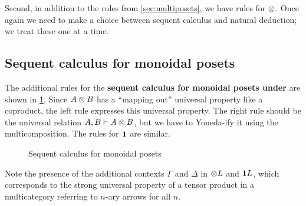 Second, in addition to the rules from \cref{sec:multiposets}, we have rules for $\otimes$.
Once again we need to make a choice between sequent calculus and natural deduction; we treat these one at a time.

\subsection{Sequent calculus for monoidal posets}
\label{sec:seqcalc-monpos}

The additional rules for the \textbf{sequent calculus for monoidal posets under \cG} are shown in \cref{fig:seqcalc-monpos}.
Since $A\otimes B$ has a ``mapping out'' universal property like a coproduct, the left rule expresses this universal property.
The right rule should be the universal relation $A,B\vdash A\otimes B$, but we have to Yoneda-ify it using the multicomposition.
The rules for $\mathbf{1}$ are similar.

\begin{figure}
  \centering
  \caption{Sequent calculus for monoidal posets}
  \label{fig:seqcalc-monpos}
\end{figure}

Note the presence of the additional contexts $\Gamma$ and $\Delta$ in $\mathord{\otimes}L$ and $\mathbf{1} L$, which corresponds to the strong universal property of a tensor product in a multicategory referring to $n$-ary arrows for all $n$.

